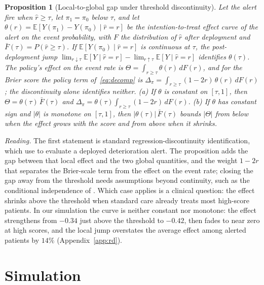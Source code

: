 \documentclass[letterpaper]{article} %
\newtheorem{proposition}{Proposition}
\newcommand{\E}{\mathbb{E}}
\newcommand{\rhat}{\hat r}
\begin{document}
\begin{proposition}[Local-to-global gap under threshold discontinuity]
\label{prop:rd}
Let the alert fire when $\rhat \geq \tau$, let $\pi_1 = \pi_0$ below $\tau$,
and let $\theta(r) = \E[Y(\pi_1) - Y(\pi_0) \mid \rhat = r]$ be the
intention-to-treat effect curve of the alert on the event probability, with
$F$ the distribution of $\rhat$ after deployment and
$\bar F(\tau) = P(\rhat \geq \tau)$. If $\E[Y(\pi_0) \mid \rhat = r]$ is
continuous at $\tau$, the post-deployment jump
$\lim_{r \downarrow \tau} \E[Y \mid \rhat = r] -
\lim_{r \uparrow \tau} \E[Y \mid \rhat = r]$ identifies $\theta(\tau)$. The
policy's effect on the event rate is
$\Theta = \int_{r \geq \tau} \theta(r)\, dF(r)$, and for the Brier score the
policy term of~\eqref{eq:decomp} is
$\Delta_\pi = \int_{r \geq \tau} (1 - 2r)\, \theta(r)\, dF(r)$; the
discontinuity alone identifies neither. (a) If $\theta$ is constant on
$[\tau, 1]$, then $\Theta = \theta(\tau)\, \bar F(\tau)$ and
$\Delta_\pi = \theta(\tau) \int_{r \geq \tau} (1 - 2r)\, dF(r)$. (b) If $\theta$
has constant sign and $|\theta|$ is monotone on $[\tau, 1]$, then
$|\theta(\tau)|\, \bar F(\tau)$ bounds $|\Theta|$ from below when the effect
grows with the score and from above when it shrinks.
\end{proposition}

\noindent\emph{Reading.} The first statement is standard regression-discontinuity
identification, which \citet{gallo2024effectiveness} use to evaluate a deployed
deterioration alert. The proposition adds the gap between that local effect and
the two global quantities, and the weight $1 - 2r$ that separates the
Brier-scale term from the effect on the event rate; closing the gap away from
the threshold needs assumptions beyond continuity, such as the conditional
independence of \citet{angrist2015wanna}. Which case applies is a clinical
question: the effect shrinks above the threshold when standard care already
treats most high-score patients. In our simulation the curve is neither constant nor monotone: the
effect strengthens from $-0.34$ just above the threshold to $-0.42$, then
fades to near zero at high scores, and the local jump overstates the average
effect among alerted patients by $14\%$ (Appendix~\ref{app:rd}).

\section{Simulation}
\label{sec:sim}
\end{document}
